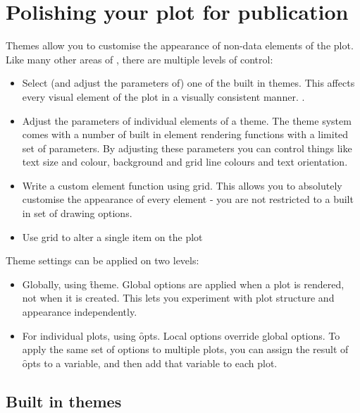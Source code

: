 

\chapter{Polishing your plot for publication}
\label{cha:theming}

Themes allow you to customise the appearance of non-data elements of the plot.  Like many other areas of \ggplot, there are multiple levels of control:

\begin{itemize}
  \item Select (and adjust the parameters of) one of the built in themes.  This affects every visual element of the plot in a visually consistent manner.  .

  \item Adjust the parameters of individual elements of a theme. The theme system comes with a number of built in element rendering functions with a limited set of parameters.  By adjusting these parameters you can control things like text size and colour, background and grid line colours and text orientation. \secref{}

  \item Write a custom element function using grid.  This allows you to absolutely customise the appearance of every element - you are not restricted to a built in set of drawing options.  

  \item Use grid to alter a single item on the plot
\end{itemize}

\noindent Theme settings can be applied on two levels:

\begin{itemize}
  \item Globally, using \f{theme}.  Global options are applied when a plot is rendered, not when it is created.  This lets you experiment with plot structure and appearance independently.

  \item For individual plots, using \f{opts}.  Local options override global options.  To apply the same set of options to multiple plots, you can assign the result of \f{opts} to a variable, and then add that variable to each plot.
\end{itemize}

\section{Built in themes}
\label{sec:built_in}

